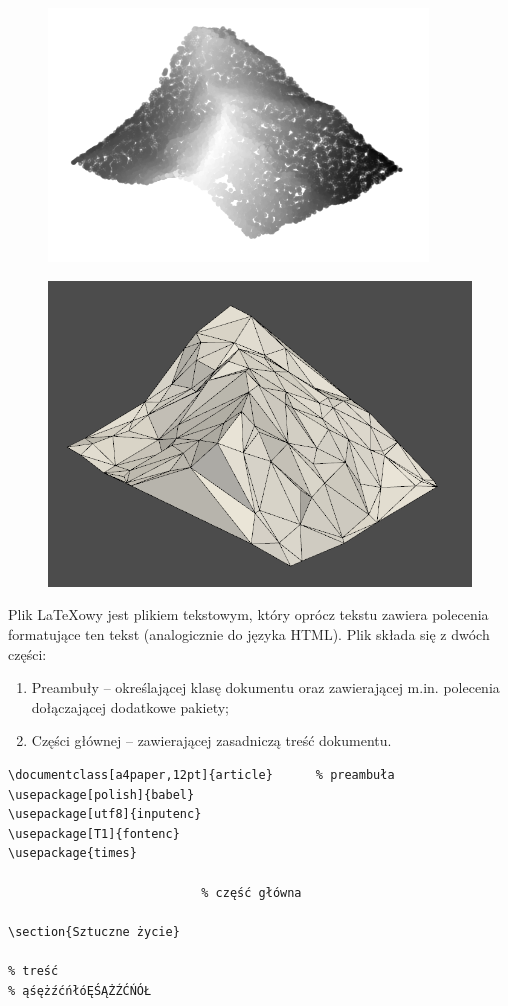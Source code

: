 \begin{figure}[h]
	\centering
	\begin{minipage}{.5\textwidth}
		\centering
		\includegraphics[width=.6\linewidth]{no_delaunay}
		\label{fig:test1}
	\end{minipage}%
	\begin{minipage}{.5\textwidth}
		\centering
		\includegraphics[width=.6\linewidth]{delaunay}
		\label{fig:test2}
	\end{minipage}
\end{figure}

Plik \LaTeX owy jest plikiem tekstowym, który oprócz tekstu zawiera polecenia formatujące ten tekst (analogicznie do języka HTML). Plik składa się z dwóch części:
\begin{enumerate}%
\item Preambuły -- określającej klasę dokumentu oraz zawierającej m.in. polecenia dołączającej dodatkowe pakiety;

\item Części głównej -- zawierającej zasadniczą treść dokumentu.
\end{enumerate}


\begin{lstlisting}
\documentclass[a4paper,12pt]{article}      % preambuła
\usepackage[polish]{babel}
\usepackage[utf8]{inputenc}
\usepackage[T1]{fontenc}
\usepackage{times}

                           % część główna

\section{Sztuczne życie}

% treść
% ąśężźćńłóĘŚĄŻŹĆŃÓŁ


\end{lstlisting}

